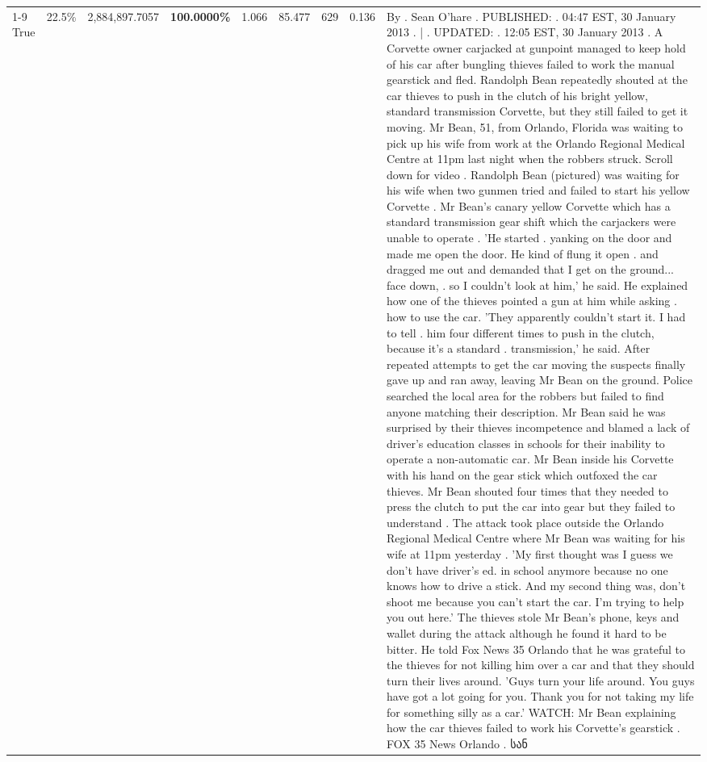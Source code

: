 \begin{table}[H]
\begin{tabular}{lllrlllll}
\cline{1-9} \cline{2-9}
True & 22.5\% & 2,884,897.7057 & \bfseries \color{red} 100.0000\% & 1.066 & 85.477 & 629 & 0.136 & By . Sean O'hare . PUBLISHED: . 04:47 EST, 30 January 2013 . | . UPDATED: . 12:05 EST, 30 January 2013 . A Corvette owner carjacked at gunpoint managed to keep hold of his car after bungling thieves failed to work the manual gearstick and fled. Randolph Bean repeatedly shouted at the car thieves to push in the clutch of his bright yellow, standard transmission Corvette, but they still failed to get it moving. Mr Bean, 51, from Orlando, Florida was waiting to pick up his wife from work at the Orlando Regional Medical Centre at 11pm last night when the robbers struck. Scroll down for video . Randolph Bean (pictured) was waiting for his wife when two gunmen tried and failed to start his yellow Corvette . Mr Bean's canary yellow Corvette which has a standard transmission gear shift which the carjackers were unable to operate . 'He started . yanking on the door and made me open the door. He kind of flung it open . and dragged me out and demanded that I get on the ground... face down, . so I couldn't look at him,' he said. He explained how one of the thieves pointed a gun at him while asking . how to use the car. 'They apparently couldn't start it. I had to tell . him four different times to push in the clutch, because it's a standard . transmission,' he said. After repeated attempts to get the car moving the suspects finally gave up and ran away, leaving Mr Bean on the ground. Police searched the local area for the robbers but failed to find anyone matching their description. Mr Bean said he was surprised by their thieves incompetence and blamed a lack of driver's education classes in schools for their inability to operate a non-automatic car. Mr Bean inside his Corvette with his hand on the gear stick which outfoxed the car thieves. Mr Bean shouted four times that they needed to press the clutch to put the car into gear but they failed to understand . The attack took place outside the Orlando Regional Medical Centre where Mr Bean was waiting for his wife at 11pm yesterday . 'My first thought was I guess we don't have driver's ed. in school anymore because no one knows how to drive a stick. And my second thing was, don't shoot me because you can't start the car. I'm trying to help you out here.' The thieves stole Mr Bean's phone, keys and wallet during the attack although he found it hard to be bitter. He told Fox News 35 Orlando that he was grateful to the thieves for not killing him over a car and that they should turn their lives around. 'Guys turn your life around. You guys have got a lot going for you. Thank you for not taking my life for something silly as a car.' WATCH: Mr Bean explaining how the car thieves failed to work his Corvette's gearstick . FOX 35 News Orlando . სან \\

\end{tabular}
\end{table}
